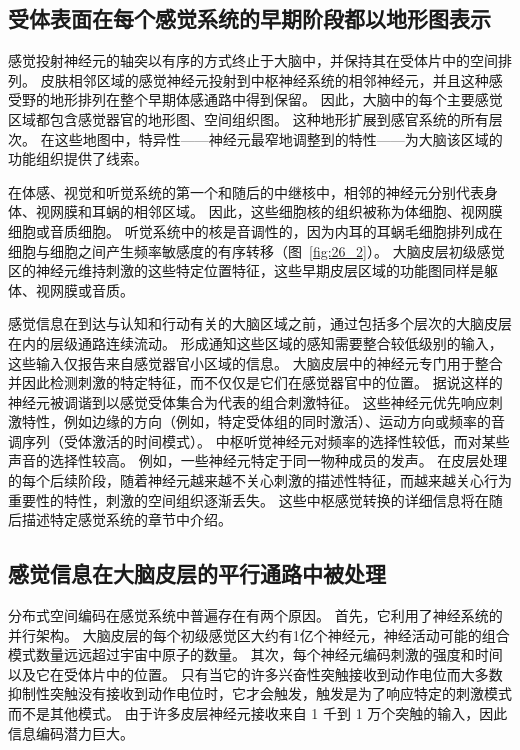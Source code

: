 \subsection{受体表面在每个感觉系统的早期阶段都以地形图表示}

感觉投射神经元的轴突以有序的方式终止于大脑中，并保持其在受体片中的空间排列。 
皮肤相邻区域的感觉神经元投射到中枢神经系统的相邻神经元，并且这种感受野的地形排列在整个早期体感通路中得到保留。 
因此，大脑中的每个主要感觉区域都包含感觉器官的地形图、空间组织图。 
这种地形扩展到感官系统的所有层次。 
在这些地图中，特异性——神经元最窄地调整到的特性——为大脑该区域的功能组织提供了线索。


在体感、视觉和听觉系统的第一个和随后的中继核中，相邻的神经元分别代表身体、视网膜和耳蜗的相邻区域。 
因此，这些细胞核的组织被称为体细胞、视网膜细胞或音质细胞。 
听觉系统中的核是音调性的，因为内耳的耳蜗毛细胞排列成在细胞与细胞之间产生频率敏感度的有序转移（图~\ref{fig:26_2}）。 
大脑皮层初级感觉区的神经元维持刺激的这些特定位置特征，这些早期皮层区域的功能图同样是躯体、视网膜或音质。


感觉信息在到达与认知和行动有关的大脑区域之前，通过包括多个层次的大脑皮层在内的层级通路连续流动。
形成通知这些区域的感知需要整合较低级别的输入，这些输入仅报告来自感觉器官小区域的信息。
大脑皮层中的神经元专门用于整合并因此检测刺激的特定特征，而不仅仅是它们在感觉器官中的位置。
据说这样的神经元被调谐到以感觉受体集合为代表的组合刺激特征。
这些神经元优先响应刺激特性，例如边缘的方向（例如，特定受体组的同时激活）、运动方向或频率的音调序列（受体激活的时间模式）。
中枢听觉神经元对频率的选择性较低，而对某些声音的选择性较高。
例如，一些神经元特定于同一物种成员的发声。
在皮层处理的每个后续阶段，随着神经元越来越不关心刺激的描述性特征，而越来越关心行为重要性的特性，刺激的空间组织逐渐丢失。
这些中枢感觉转换的详细信息将在随后描述特定感觉系统的章节中介绍。



\subsection{感觉信息在大脑皮层的平行通路中被处理}

分布式空间编码在感觉系统中普遍存在有两个原因。 
首先，它利用了神经系统的并行架构。 
大脑皮层的每个初级感觉区大约有1亿个神经元，神经活动可能的组合模式数量远远超过宇宙中原子的数量。 
其次，每个神经元编码刺激的强度和时间以及它在受体片中的位置。 
只有当它的许多兴奋性突触接收到动作电位而大多数抑制性突触没有接收到动作电位时，它才会触发，触发是为了响应特定的刺激模式而不是其他模式。 
由于许多皮层神经元接收来自 1 千到 1 万个突触的输入，因此信息编码潜力巨大。


